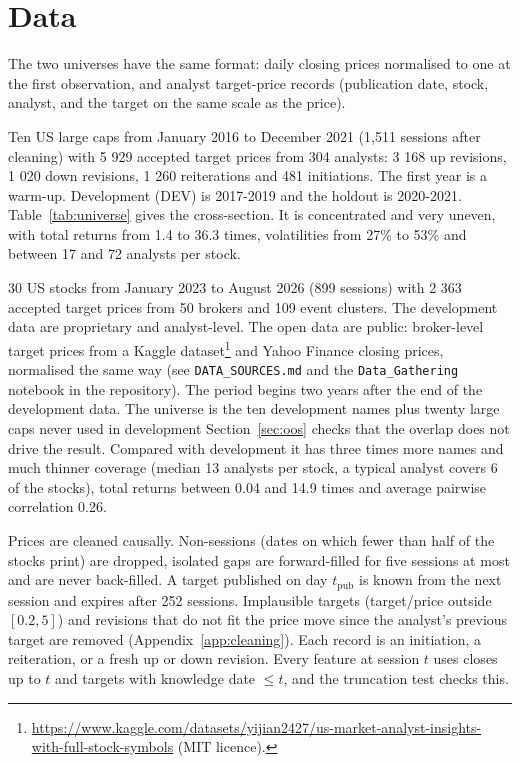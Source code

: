 \section{Data}\label{sec:data}

The two universes have the same format: daily closing prices normalised to one at the first observation, and analyst target-price records (publication date, stock, analyst, and the target on the same scale as the price).

 Ten US large caps from January 2016 to December 2021 (1,511 sessions after cleaning) with 5 929 accepted target prices from 304 analysts: 3 168 up revisions, 1 020 down revisions, 1 260 reiterations and 481 initiations. The first year is a warm-up. Development (DEV) is 2017-2019 and the holdout is 2020-2021. Table~\ref{tab:universe} gives the cross-section. It is concentrated and very uneven, with total returns from 1.4 to 36.3 times, volatilities from 27\% to 53\% and between 17 and 72 analysts per stock.

 30 US stocks from January 2023 to August 2026 (899 sessions) with 2 363 accepted target prices from 50 brokers and 109 event clusters. The development data are proprietary and analyst-level. The open data are public: broker-level target prices from a Kaggle dataset\footnote{\url{https://www.kaggle.com/datasets/yijian2427/us-market-analyst-insights-with-full-stock-symbols} (MIT licence).} and Yahoo Finance closing prices, normalised the same way (see \texttt{DATA\_SOURCES.md} and the \texttt{Data\_Gathering} notebook in the repository). The period begins two years after the end of the development data. The universe is the ten development names plus twenty large caps never used in development Section~\ref{sec:oos} checks that the overlap does not drive the result. Compared with development it has three times more names and much thinner coverage (median 13 analysts per stock, a typical analyst covers 6 of the stocks), total returns between 0.04 and 14.9 times and average pairwise correlation 0.26.

 Prices are cleaned causally. Non-sessions (dates on which fewer than half of the stocks print) are dropped, isolated gaps are forward-filled for five sessions at most and are never back-filled. A target published on day $t_{\text{pub}}$ is known from the next session and expires after 252 sessions. Implausible targets (target/price outside $[0.2,5]$) and revisions that do not fit the price move since the analyst's previous target are removed (Appendix~\ref{app:cleaning}). Each record is an initiation, a reiteration, or a fresh up or down revision. Every feature at session $t$ uses closes up to $t$ and targets with knowledge date $\le t$, and the truncation test checks this.

